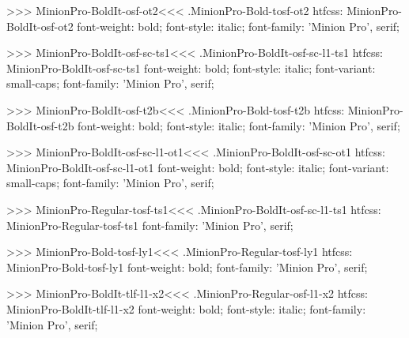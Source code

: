 {>>>
\<MinionPro-BoldIt-osf-ot2\><<<
.MinionPro-Bold-tosf-ot2
htfcss:  MinionPro-BoldIt-osf-ot2  font-weight: bold; font-style: italic; font-family: 'Minion Pro', serif;

>>>
\<MinionPro-BoldIt-osf-sc-ts1\><<<
.MinionPro-BoldIt-osf-sc-l1-ts1
htfcss:  MinionPro-BoldIt-osf-sc-ts1  font-weight: bold; font-style: italic; font-variant: small-caps; font-family: 'Minion Pro', serif;

>>>
\<MinionPro-BoldIt-osf-t2b\><<<
.MinionPro-Bold-tosf-t2b
htfcss:  MinionPro-BoldIt-osf-t2b  font-weight: bold; font-style: italic; font-family: 'Minion Pro', serif;

>>>
\<MinionPro-BoldIt-osf-sc-l1-ot1\><<<
.MinionPro-BoldIt-osf-sc-ot1
htfcss:  MinionPro-BoldIt-osf-sc-l1-ot1  font-weight: bold; font-style: italic; font-variant: small-caps; font-family: 'Minion Pro', serif;

>>>
\<MinionPro-Regular-tosf-ts1\><<<
.MinionPro-BoldIt-osf-sc-l1-ts1
htfcss:  MinionPro-Regular-tosf-ts1  font-family: 'Minion Pro', serif;

>>>
\<MinionPro-Bold-tosf-ly1\><<<
.MinionPro-Regular-tosf-ly1
htfcss:  MinionPro-Bold-tosf-ly1  font-weight: bold; font-family: 'Minion Pro', serif;

>>>
\<MinionPro-BoldIt-tlf-l1-x2\><<<
.MinionPro-Regular-osf-l1-x2
htfcss:  MinionPro-BoldIt-tlf-l1-x2  font-weight: bold; font-style: italic; font-family: 'Minion Pro', serif;

}
